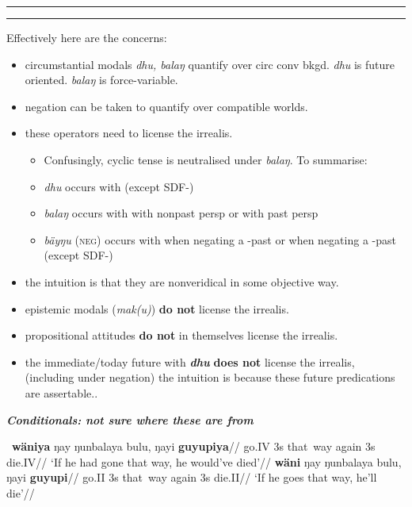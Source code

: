 \hrule\hrule\vspace*{.1em}
\small
\begin{framed}Effectively here are the concerns:
\begin{itemize}
	\item circumstantial modals \textit{dhu, balaŋ} quantify over circ conv bkgd. \textit{dhu} is future oriented. \textit{balaŋ} is force-variable.
	\item negation can be taken to quantify over compatible worlds. 
	\item these operators need to license the irrealis.
	\begin{itemize}
\item 	Confusingly, cyclic tense is neutralised under \textit{balaŋ}. To summarise:
\item \textit{dhu} occurs with \II{} (except SDF-\I)
\item \textit{balaŋ} occurs with \II{} with nonpast persp or \IV{} with past persp
\item \textit{bäyŋu} (\textsc{neg}) occurs with \IV{} when negating a \III-past or \II{} when negating a \I-past (except SDF-\I)
	\end{itemize}
	\item the intuition is that they are nonveridical in some objective way.
	\item epistemic modals (\textit{mak(u)}) \textbf{do not} license the irrealis.
	\item propositional attitudes \textbf{do not} in themselves license the irrealis.
	\item the immediate/today future with \textbf{\textit{dhu}} \textbf{does not} license the irrealis, (including under negation) the intuition is because these future predications are assertable..

\end{itemize}
\textbf{\textit{Conditionals: not sure where these are from}}

\pex~\a\begingl\gla {}\textbf{wäniya} ŋay ŋunbalaya bulu, ŋayi \textbf{guyupiya}//
\glb go.IV 3s that~way again 3s die.IV//
\glft`If he had gone that way, he would've died'//\endgl
\a \begingl\gla {}\textbf{wäni} ŋay ŋunbalaya bulu, ŋayi \textbf{guyupi}//
\glb go.II{} 3s that~way again 3s die.II//
\glft`If he goes that way, he'll die'//\endgl\xe
\normalsize\end{framed}




